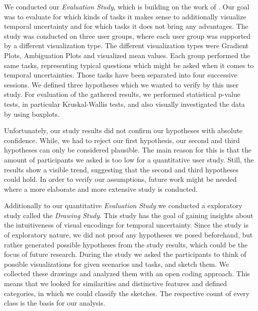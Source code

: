We conducted our \textit{Evaluation Study}, which is building on the work of \citet{gschwandtner2016visual}. Our goal was to evaluate for which kinds of tasks it makes sense to additionally visualize temporal uncertainty and for which tasks it does not bring any advantages. The study was conducted on three user groups, where each user group was supported by a different visualization type. The different visualization types were Gradient Plots, Ambiguation Plots and visualized mean values. Each group performed the same tasks, representing typical questions which might be asked when it comes to temporal uncertainties. Those tasks have been separated into four successive sessions. We defined three hypotheses which we wanted to verify by this user study. For evaluation of the gathered results, we performed statistical p-value tests, in particular Kruskal-Wallis tests, and also visually investigated the data by using boxplots. \par \medskip

Unfortunately, our study results did not confirm our hypotheses with absolute confidence. While, we had to reject our first hypothesis, our second and third hypotheses can only be considered plausible. The main reason for this is that the amount of participants we asked is too low for a quantitative user study. Still, the results show a visible trend, suggesting that the second and third hypotheses could hold. In order to verify our assumptions, future work might be needed where a more elaborate and more extensive study is conducted. \par \medskip


Additionally to our quantitative \textit{Evaluation Study} we conducted a exploratory study called the \textit{Drawing Study}. This study has the goal of gaining insights about the intuitiveness of visual encodings for temporal uncertainty. Since the study is of exploratory nature, we did not proof any hypotheses we posed beforehand, but rather generated possible hypotheses from the study results, which could be the focus of future research. During the study we asked the participants to think of possible visualizations for given scenarios and tasks, and sketch them. We collected these drawings and analyzed them with an open coding approach. This means that we looked for similarities and distinctive features and defined categories, in which we could classify the sketches. The respective count of every class is the basis for our analysis. \par \medskip

